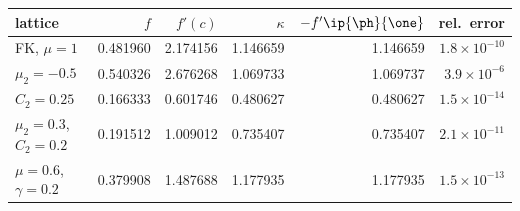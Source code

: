 \begin{tabular}{@{}lrrrrr@{}}
\toprule
lattice & $f$ & $f'(c)$ & $\kappa$ & $-f'\ip{\ph}{\one}$ & rel.\ error\\
\midrule
FK, $\mu=1$ & 0.481960 & 2.174156 & 1.146659 & 1.146659 & $1.8\times10^{-10}$\\
$\mu_2=-0.5$ & 0.540326 & 2.676268 & 1.069733 & 1.069737 & $3.9\times10^{-6}$\\
$C_2=0.25$ & 0.166333 & 0.601746 & 0.480627 & 0.480627 & $1.5\times10^{-14}$\\
$\mu_2=0.3$, $C_2=0.2$ & 0.191512 & 1.009012 & 0.735407 & 0.735407 & $2.1\times10^{-11}$\\
$\mu=0.6$, $\gamma=0.2$ & 0.379908 & 1.487688 & 1.177935 & 1.177935 & $1.5\times10^{-13}$\\
\bottomrule
\end{tabular}
